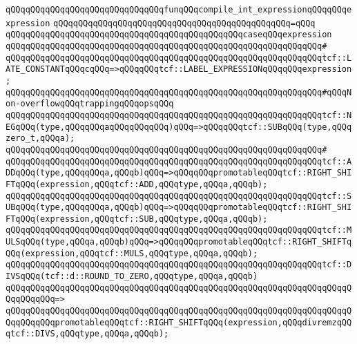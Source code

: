 \newline
\verb|qQQqqQQqqQQqqQQqqQQqqQQqqQQqqQQqfunqQQqcompile_int_expressionqQQqqQQqexpression|\newline
\verb|qQQqqQQqqQQqqQQqqQQqqQQqqQQqqQQqqQQqqQQqqQQqqQQq=qQQq|\newline
\verb|qQQqqQQqqQQqqQQqqQQqqQQqqQQqqQQqqQQqqQQqqQQqqQQqcaseqQQqexpression|\newline
\verb|qQQqqQQqqQQqqQQqqQQqqQQqqQQqqQQqqQQqqQQqqQQqqQQqqQQqqQQqqQQqqQQq#|\newline
\verb|qQQqqQQqqQQqqQQqqQQqqQQqqQQqqQQqqQQqqQQqqQQqqQQqqQQqqQQqqQQqqQQqtcf::LATE_CONSTANTqQQqcqQQq=>qQQqqQQqtcf::LABEL_EXPRESSIONqQQqqQQqexpression;|\newline
\newline
\verb|qQQqqQQqqQQqqQQqqQQqqQQqqQQqqQQqqQQqqQQqqQQqqQQqqQQqqQQqqQQqqQQq#qQQqNon-overflowqQQqtrappingqQQqopsqQQq|\newline
\newline
\verb|qQQqqQQqqQQqqQQqqQQqqQQqqQQqqQQqqQQqqQQqqQQqqQQqqQQqqQQqqQQqqQQqtcf::NEGqQQq(type,qQQqqQQqaqQQqqQQqqQQq)qQQq=>qQQqqQQqtcf::SUBqQQq(type,qQQqzero_t,qQQqa);|\newline
\verb|qQQqqQQqqQQqqQQqqQQqqQQqqQQqqQQqqQQqqQQqqQQqqQQqqQQqqQQqqQQqqQQq#|\newline
\verb|qQQqqQQqqQQqqQQqqQQqqQQqqQQqqQQqqQQqqQQqqQQqqQQqqQQqqQQqqQQqqQQqtcf::ADDqQQq(type,qQQqqQQqa,qQQqb)qQQq=>qQQqqQQqpromotableqQQqtcf::RIGHT_SHIFTqQQq(expression,qQQqtcf::ADD,qQQqtype,qQQqa,qQQqb);|\newline
\verb|qQQqqQQqqQQqqQQqqQQqqQQqqQQqqQQqqQQqqQQqqQQqqQQqqQQqqQQqqQQqqQQqtcf::SUBqQQq(type,qQQqqQQqa,qQQqb)qQQq=>qQQqqQQqpromotableqQQqtcf::RIGHT_SHIFTqQQq(expression,qQQqtcf::SUB,qQQqtype,qQQqa,qQQqb);|\newline
\verb|qQQqqQQqqQQqqQQqqQQqqQQqqQQqqQQqqQQqqQQqqQQqqQQqqQQqqQQqqQQqqQQqtcf::MULSqQQq(type,qQQqa,qQQqb)qQQq=>qQQqqQQqpromotableqQQqtcf::RIGHT_SHIFTqQQq(expression,qQQqtcf::MULS,qQQqtype,qQQqa,qQQqb);|\newline
\newline
\verb|qQQqqQQqqQQqqQQqqQQqqQQqqQQqqQQqqQQqqQQqqQQqqQQqqQQqqQQqqQQqqQQqtcf::DIVSqQQq(tcf::d::ROUND_TO_ZERO,qQQqtype,qQQqa,qQQqb)|\newline
\verb|qQQqqQQqqQQqqQQqqQQqqQQqqQQqqQQqqQQqqQQqqQQqqQQqqQQqqQQqqQQqqQQqqQQqqQQqqQQqqQQq=>|\newline
\verb|qQQqqQQqqQQqqQQqqQQqqQQqqQQqqQQqqQQqqQQqqQQqqQQqqQQqqQQqqQQqqQQqqQQqqQQqqQQqqQQqpromotableqQQqtcf::RIGHT_SHIFTqQQq(expression,qQQqdivremzqQQqtcf::DIVS,qQQqtype,qQQqa,qQQqb);|\newline
